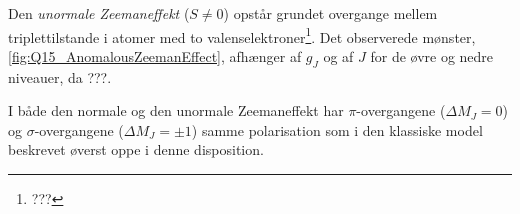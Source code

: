 Den \emph{unormale Zeemaneffekt} ($S \ne 0$) opstår grundet overgange mellem triplettilstande i atomer med to valenselektroner\footnote{???}. Det observerede mønster, \cref{fig:Q15_AnomalousZeemanEffect}, afhænger af $g_J$ og af $J$ for de øvre og nedre niveauer, da ???.

I både den normale og den unormale Zeemaneffekt har $\pi$-overgangene ($\Delta M_J = 0$) og $\sigma$-overgangene ($\Delta M_J = \pm 1$) samme polarisation som i den klassiske model beskrevet øverst oppe i denne disposition.